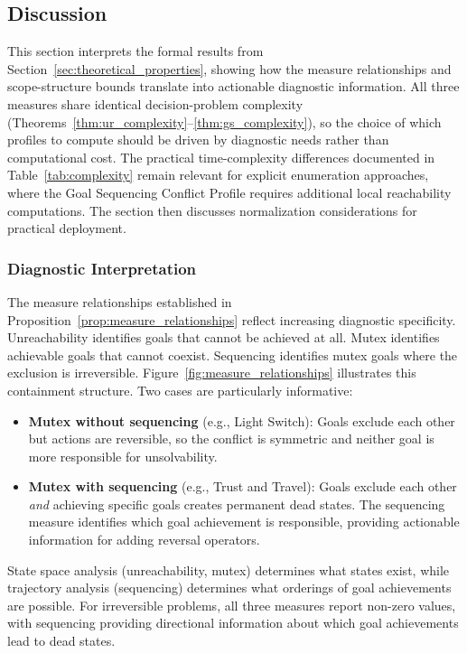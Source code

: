 \subsection{Discussion}
\label{sec:discussion}

This section interprets the formal results from Section~\ref{sec:theoretical_properties}, showing how the measure relationships and scope-structure bounds translate into actionable diagnostic information. All three measures share identical decision-problem complexity (Theorems~\ref{thm:ur_complexity}--\ref{thm:gs_complexity}), so the choice of which profiles to compute should be driven by diagnostic needs rather than computational cost. The practical time-complexity differences documented in Table~\ref{tab:complexity} remain relevant for explicit enumeration approaches, where the Goal Sequencing Conflict Profile requires additional local reachability computations. The section then discusses normalization considerations for practical deployment.

\subsubsection{Diagnostic Interpretation}

The measure relationships established in Proposition~\ref{prop:measure_relationships} reflect increasing diagnostic specificity. Unreachability identifies goals that cannot be achieved at all. Mutex identifies achievable goals that cannot coexist. Sequencing identifies mutex goals where the exclusion is irreversible. Figure~\ref{fig:measure_relationships} illustrates this containment structure. Two cases are particularly informative:

\begin{itemize}
    \item \textbf{Mutex without sequencing} (e.g., Light Switch): Goals exclude
          each other but actions are reversible, so the conflict is symmetric
          and neither goal is more responsible for unsolvability.
    \item \textbf{Mutex with sequencing} (e.g., Trust and Travel): Goals exclude
          each other \emph{and} achieving specific goals creates permanent dead
          states. The sequencing measure identifies which goal achievement is
          responsible, providing actionable information for adding reversal
          operators.
\end{itemize}

State space analysis (unreachability, mutex) determines what states exist, while trajectory analysis (sequencing) determines what orderings of goal achievements are possible. For irreversible problems, all three measures report non-zero values, with sequencing providing directional information about which goal achievements lead to dead states.

